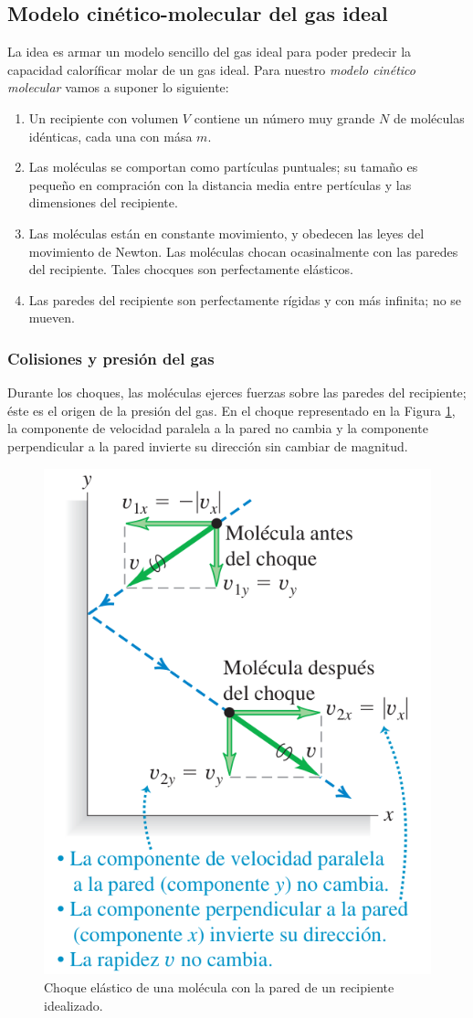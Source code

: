 \documentclass[12pt]{article}
\begin{document}
  \subsection{Modelo cinético-molecular del gas ideal}
  La idea es armar un modelo sencillo del gas ideal para poder predecir la capacidad caloríficar molar de un gas ideal.
  Para nuestro \textit{modelo cinético molecular} vamos a suponer lo siguiente:
  \begin{enumerate}[1.]
    \item Un recipiente con volumen $ V $ contiene un número muy grande $ N $ de moléculas idénticas, cada una con mása $ m $.

    \item Las moléculas se comportan como partículas puntuales; su tamaño es pequeño en compración con la distancia media entre pertículas y las dimensiones del recipiente.

    \item Las moléculas están en constante movimiento, y obedecen las leyes del movimiento de Newton. Las  moléculas chocan ocasinalmente con las paredes del recipiente. Tales chocques son perfectamente elásticos.

    \item Las paredes del recipiente son perfectamente rígidas y con más infinita; no se mueven.
  \end{enumerate}

  \subsubsection{Colisiones y presión del gas}
  Durante los choques, las moléculas ejerces fuerzas sobre las paredes del recipiente; éste es el origen de la presión del gas. En el choque representado en la Figura \ref{fig:choque-gas}, la componente de velocidad paralela a la pared no cambia y la componente perpendicular a la pared invierte su dirección sin cambiar de magnitud.

  \begin{figure}[H]
    \centering
    \includegraphics[width=0.5\linewidth]{imagenes/choque-molecula-gas.png}
    \caption{Choque elástico de una molécula con la pared de un recipiente idealizado.}
    \label{fig:choque-gas}
  \end{figure}
  
\end{document}
